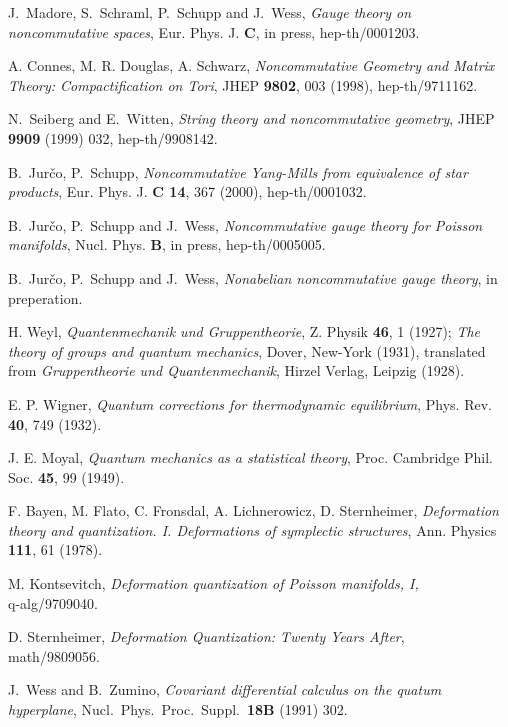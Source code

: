 \documentclass[a4paper,11pt]{article}
\newcommand*\ti[5]{{\em #5}, {#1} {\bf #2}, #3 (#4)}
\newcommand*\jhep{JHEP}
\newcommand*\pr{Phys. Rev.}
\begin{document}
\begin{thebibliography}{99}

J.~Madore, S.~Schraml, P.~Schupp and J.~Wess,
{\it Gauge theory on noncommutative spaces},
Eur. Phys. J. {\bf C}, in press,
hep-th/0001203.

 A. Connes, M. R. Douglas, A. Schwarz,
\ti{\jhep}{9802}{003}{1998}{Noncommutative Geometry and Matrix Theory:
Compactification on Tori}, hep-th/9711162.

N.~Seiberg and E.~Witten,
{\it String theory and noncommutative geometry},
JHEP {\bf 9909} (1999) 032,
hep-th/9908142.

B.~Jur\v co, P.~Schupp,
{\it Noncommutative Yang-Mills from equivalence of star products},
Eur. Phys. J. {\bf C 14}, 367 (2000), hep-th/0001032.

B.~Jur\v co, P.~Schupp and J.~Wess,
{\it Noncommutative gauge theory for Poisson manifolds},
Nucl. Phys. {\bf B}, in press,
hep-th/0005005.

B.~Jur\v co, P.~Schupp and J.~Wess,
{\it Nonabelian noncommutative gauge theory},
in preperation.

H. Weyl, \ti{Z. Physik}{46}{1}{1927}{Quantenmechanik
und Gruppentheorie}; {\em The theory of groups and quantum
mechanics}, Dover, New-York (1931), translated from {\em
Gruppentheorie und Quantenmechanik}, Hirzel Verlag, Leipzig (1928).

E. P. Wigner, \ti{\pr}{40}{749}{1932}{Quantum
corrections for thermodynamic equilibrium}.

J. E. Moyal, \ti{Proc. Cambridge Phil.
Soc.}{45}{99}{1949}{Quantum mechanics as a statistical theory}.

 F. Bayen, M. Flato, C. Fronsdal, A. Lichnerowicz, D.
Sternheimer, \ti{Ann. Physics}{111}{61}{1978}{Deformation theory and
quantization. I. Deformations of symplectic structures}.

 M. Kontsevitch, \emph{Deformation quantization of Poisson
manifolds, I,}\\q-alg/9709040.

 D. Sternheimer, \emph{Deformation Quantization: Twenty
Years After}, \\math/9809056.

J.~Wess and B.~Zumino,
{\it Covariant differential calculus on the quatum hyperplane}, 
Nucl.\ Phys.\ Proc.\ Suppl.\  {\bf 18B} (1991) 302.



\end{thebibliography}
\end{document}
